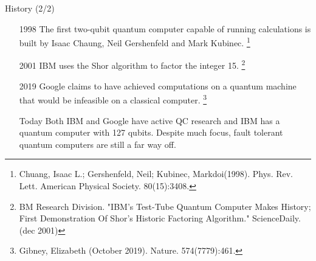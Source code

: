\documentclass[t]{beamer}
\begin{document}
\begin{frame}{History (2/2)}

\begin{itemize}
\item[1998] The first two-qubit quantum computer capable of running calculations is built by Isaac Chaung, Neil Gershenfeld and Mark Kubinec. 
\footnote{\scriptsize Chuang, Isaac L.; Gershenfeld, Neil; Kubinec, Markdoi(1998). Phys. Rev. Lett. American Physical Society. 80(15):3408.}

\item[2001] IBM uses the Shor algorithm to factor the integer 15. \footnote{BM Research Division. "IBM's Test-Tube Quantum Computer Makes History; First Demonstration Of Shor's Historic Factoring Algorithm." ScienceDaily. (dec 2001)}

\item[2019] Google claims to have achieved computations on a quantum machine that would be infeasible on a classical computer.  
\footnote{\scriptsize Gibney, Elizabeth (October 2019). Nature. 574(7779):461.}


\item[Today] Both IBM and Google have active QC research and IBM has a quantum computer with 127 qubits. Despite much focus, fault tolerant quantum computers are still a far way off.

\end{itemize}
\end{frame}
\end{document}
